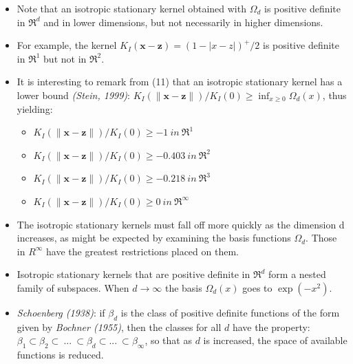 \documentclass[
  ignorenonframetext,
]{beamer}
\providecommand{\tightlist}{%
  \setlength{\itemsep}{0pt}\setlength{\parskip}{0pt}}
\begin{document}
\begin{frame}{}
\protect\hypertarget{section-5}{}
\begin{itemize}
\item
  Note that an isotropic stationary kernel obtained with \(\Omega_d\) is
  positive definite in \(\mathfrak R^d\) and in lower dimensions, but
  not necessarily in higher dimensions.
\item
  For example, the kernel \(K_I(\pmb x - \pmb z) = (1 - |x - z|)^+/2\)
  is positive definite in \(\mathfrak R^1\) but not in
  \(\mathfrak R^2\).
\item
  It is interesting to remark from (11) that an isotropic stationary
  kernel has a lower bound \emph{(Stein, 1999)}:
  \(K_I(\|\pmb x - \pmb z\|)/K_I(0) \geq \inf_{x \geq 0} \Omega_d(x)\),
  thus yielding:

  \begin{itemize}
  \tightlist
  \item
    \(K_I(\|\pmb x - \pmb z\|)/K_I(0) \geq -1\ in\ \mathfrak R^1\)\\
  \item
    \(K_I(\|\pmb x - \pmb z\|)/K_I(0) \geq -0.403\ in\ \mathfrak R^2\)\\
  \item
    \(K_I(\|\pmb x - \pmb z\|)/K_I(0) \geq -0.218\ in\ \mathfrak R^3\)\\
  \item
    \(K_I(\|\pmb x - \pmb z\|)/K_I(0) \geq 0\ in\ \mathfrak R^\infty\)
  \end{itemize}
\end{itemize}
\end{frame}

\begin{frame}{}
\protect\hypertarget{section-6}{}
\begin{itemize}
\item
  The isotropic stationary kernels must fall off more quickly as the
  dimension d increases, as might be expected by examining the basis
  functions \(\Omega_d\). Those in \(R^\infty\) have the greatest
  restrictions placed on them.
\item
  Isotropic stationary kernels that are positive definite in
  \(\mathfrak R^d\) form a nested family of subspaces. When
  \(d \rightarrow \infty\) the basis \(\Omega_d(x)\) goes to
  \(\exp(-x^2)\).
\item
  \emph{Schoenberg (1938)}: if \(\beta_d\) is the class of positive
  definite functions of the form given by \emph{Bochner (1955)}, then
  the classes for all \(d\) have the property:
  \(\beta_1 \subset \beta_2 \subset \ ...\ \subset \beta_d \subset ...\ \subset \beta_\infty\),
  so that as \(d\) is increased, the space of available functions is
  reduced.
\end{itemize}
\end{frame}
\end{document}
